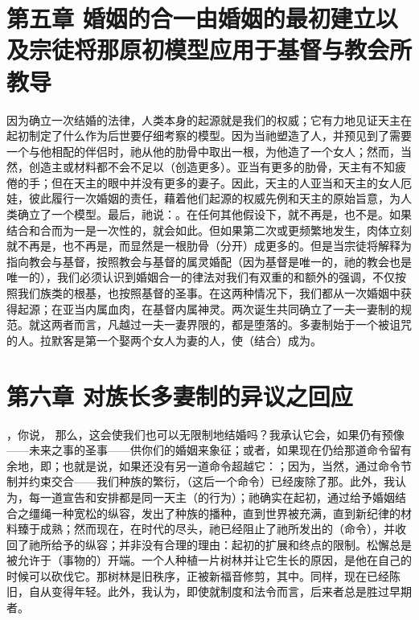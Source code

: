 \section{第五章 婚姻的合一由婚姻的最初建立以及宗徒将那原初模型应用于基督与教会所教导}

因为确立一次结婚的法律，人类本身的起源就是我们的权威；它有力地见证天主在起初制定了什么作为后世要仔细考察的模型。因为当祂塑造了人，并预见到了需要一个与他相配的伴侣时，祂从他的肋骨中取出一根，为他造了一个女人；然而，当然，创造主或材料都不会不足以（创造更多）。亚当有更多的肋骨，天主有不知疲倦的手；但在天主的眼中并没有更多的妻子。因此，天主的人亚当和天主的女人厄娃，彼此履行一次婚姻的责任，藉着他们起源的权威先例和天主的原始旨意，为人类确立了一个模型。最后，祂说：。在任何其他假设下，就不再是，也不是。如果结合和合而为一是一次性的，就会如此。但如果第二次或更频繁地发生，肉体立刻就不再是，也不再是，而显然是一根肋骨（分开）成更多的。但是当宗徒将解释为指向教会与基督，按照教会与基督的属灵婚配（因为基督是唯一的，祂的教会也是唯一的），我们必须认识到婚姻合一的律法对我们有双重的和额外的强调，不仅按照我们族类的根基，也按照基督的圣事。在这两种情况下，我们都从一次婚姻中获得起源；在亚当内属血肉，在基督内属神灵。两次诞生共同确立了一夫一妻制的规范。就这两者而言，凡越过一夫一妻界限的，都是堕落的。多妻制始于一个被诅咒的人。拉默客是第一个娶两个女人为妻的人，使（结合）成为。\par


\section{第六章 对族长多妻制的异议之回应}

，你说， 那么，这会使我们也可以无限制地结婚吗？我承认它会，如果仍有预像——未来之事的圣事——供你们的婚姻来象征；或者，如果现在仍给那道命令留有余地，即；也就是说，如果还没有另一道命令超越它：；因为，当然，通过命令节制并约束交合——我们种族的繁衍，（这后一个命令）已经废除了那。此外，我认为，每一道宣告和安排都是同一天主（的行为）；祂确实在起初，通过给予婚姻结合之缰绳一种宽松的纵容，发出了种族的播种，直到世界被充满，直到新纪律的材料臻于成熟；然而现在，在时代的尽头，祂已经阻止了祂所发出的（命令），并收回了祂所给予的纵容；并非没有合理的理由：起初的扩展和终点的限制。松懈总是被允许于（事物的）开端。一个人种植一片树林并让它生长的原因，是他在自己的时候可以砍伐它。那树林是旧秩序，正被新福音修剪，其中。同样，现在已经陈旧，自从变得年轻。此外，我认为，即使就制度和法令而言，后来者总是胜过早期者。\par

